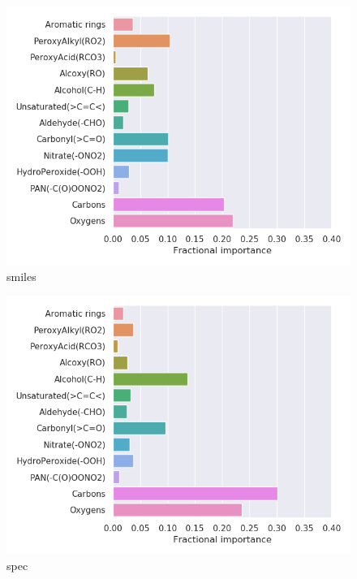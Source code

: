 \begin{subfigure}[b]{0.5\textwidth}
    \centering
    \includegraphics[width=\textwidth]{outputs/t-SNE/smiles/legend.png}
    \caption{smiles}
    \label{fig:legend_t-SNE_smiles}
\end{subfigure}
\begin{subfigure}[b]{0.5\textwidth}
    \centering
    \includegraphics[width=\textwidth]{outputs/t-SNE/spec/legend.png}
    \caption{spec}
    \label{fig:legend_t-SNE_spec}
\end{subfigure}

